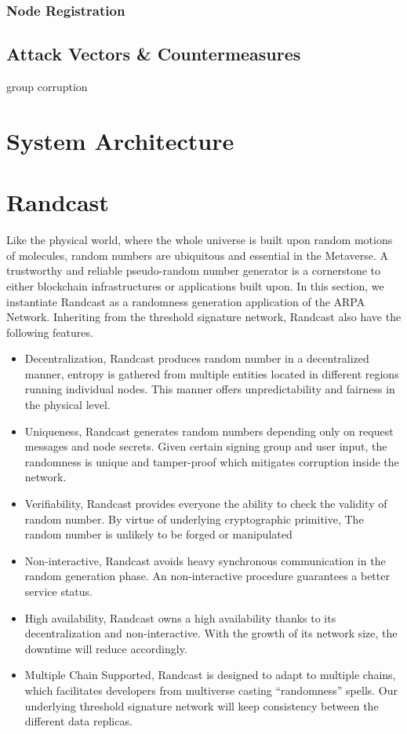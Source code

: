 \documentclass[11pt]{article}
\begin{document}
\subsubsection{Node Registration}

\subsection{Attack Vectors \& Countermeasures}

group corruption


\section{System Architecture}


\section{Randcast}

Like the physical world, where the whole universe is built upon random motions of molecules, random numbers are ubiquitous and essential in the Metaverse. A trustworthy and reliable pseudo-random number generator is a cornerstone to either blockchain infrastructures or applications built upon. In this section, we instantiate Randcast as a randomness generation application of the ARPA Network. Inheriting from the threshold signature network, Randcast also have the following features.

\begin{itemize}
    \item Decentralization, Randcast produces random number in a decentralized manner, entropy is gathered from multiple entities located in different regions running individual nodes. This manner offers unpredictability and fairness in the physical level.
    \item Uniqueness, Randcast generates random numbers depending only on request messages and node secrets. Given certain signing group and user input, the randomness is unique and tamper-proof which mitigates corruption inside the network.
    \item Verifiability, Randcast provides everyone the ability to check the validity of random number. By virtue of underlying cryptographic primitive, The random number is unlikely to be forged or manipulated
    \item Non-interactive, Randcast avoids heavy synchronous communication in the random generation phase. An non-interactive procedure guarantees a better service status.
    \item High availability, Randcast owns a high availability thanks to its decentralization and non-interactive. With the growth of its network size, the downtime will reduce accordingly.
    \item Multiple Chain Supported, Randcast is designed to adapt to multiple chains, which facilitates developers from multiverse casting “randomness” spells. Our underlying threshold signature network will keep consistency between the different data replicas.
\end{itemize}
\end{document}
